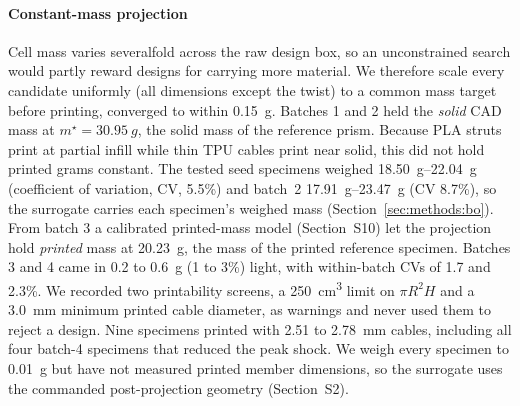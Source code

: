 \documentclass[11pt]{article}
\begin{document}
\paragraph{Constant-mass projection} Cell mass varies severalfold across
the raw design box, so an unconstrained search would partly reward
designs for carrying more material. We therefore scale every candidate
uniformly (all dimensions except the twist) to a common mass target
before printing, converged to within \SI{0.15}{g}. Batches 1 and 2 held
the \emph{solid} CAD mass at $m^{\star} = \SI{30.95}{g}$, the solid mass
of the reference prism. Because PLA struts print at partial infill while
thin TPU cables print near solid, this did not hold printed grams
constant. The tested seed specimens weighed \SIrange{18.50}{22.04}{g}
(coefficient of variation, CV, 5.5\%) and batch~2
\SIrange{17.91}{23.47}{g} (CV 8.7\%), so the surrogate carries each
specimen's weighed mass (Section~\ref{sec:methods:bo}). From batch 3 a
calibrated printed-mass model (Section~S10) let the
projection hold \emph{printed} mass at \SI{20.23}{g}, the mass of the
printed reference specimen. Batches 3 and 4 came in 0.2 to \SI{0.6}{g}
(1 to 3\%) light, with within-batch CVs of 1.7 and 2.3\%. We recorded
two printability screens, a \SI{250}{cm^3} limit on $\pi R^2 H$ and a
\SI{3.0}{mm} minimum printed cable diameter, as warnings and never used
them to reject a design. Nine specimens printed with 2.51 to
\SI{2.78}{mm} cables, including all four batch-4 specimens that reduced
the peak shock. We weigh every specimen to \SI{0.01}{g} but have not
measured printed member dimensions, so the surrogate uses the commanded
post-projection geometry (Section~S2).
\end{document}
